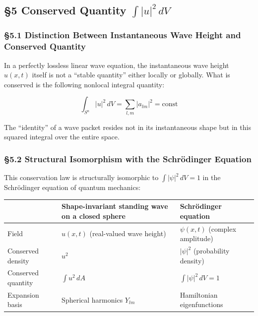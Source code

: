 \documentclass[
  a4paper,11pt]{article}
\newcounter{none}
\theoremstyle{definition}
\theoremstyle{remark}
\begin{document}
\subsection{\texorpdfstring{§5 Conserved Quantity
\(\int |u|^2 \, dV\)}{§5 Conserved Quantity \textbackslash int \textbar u\textbar\^{}2 \textbackslash, dV}}\label{conserved-quantity-int-u2-dv}

\subsubsection{§5.1 Distinction Between Instantaneous Wave Height and
Conserved
Quantity}\label{distinction-between-instantaneous-wave-height-and-conserved-quantity}

In a perfectly lossless linear wave equation, the instantaneous wave
height \(u(x,t)\) itself is not a ``stable quantity'' either locally or
globally. What is conserved is the following nonlocal integral quantity:

\[\int_{S^n} |u|^2 \, dV = \sum_{l,m} |a_{lm}|^2 = \text{const}\]

The ``identity'' of a wave packet resides not in its instantaneous shape
but in this squared integral over the entire space.

\subsubsection{§5.2 Structural Isomorphism with the Schrödinger
Equation}\label{structural-isomorphism-with-the-schruxf6dinger-equation}

This conservation law is structurally isomorphic to
\(\int |\psi|^2 \, dV = 1\) in the Schrödinger equation of quantum
mechanics:

{\def\LTcaptype{none} %
\begin{longtable}[]{@{}
  >{\raggedright\arraybackslash}p{}
  >{\raggedright\arraybackslash}p{}
  >{\raggedright\arraybackslash}p{}@{}}
\toprule\noalign{}
\begin{minipage}[b]{\linewidth}\raggedright
\end{minipage} & \begin{minipage}[b]{\linewidth}\raggedright
Shape-invariant standing wave on a closed sphere
\end{minipage} & \begin{minipage}[b]{\linewidth}\raggedright
Schrödinger equation
\end{minipage} \\
\midrule\noalign{}
\endhead
\bottomrule\noalign{}
\endlastfoot
Field & \(u(x,t)\) (real-valued wave height) & \(\psi(x,t)\) (complex
amplitude) \\
Conserved density & \(u^2\) & \(|\psi|^2\) (probability density) \\
Conserved quantity & \(\int u^2 \, dA\) & \(\int |\psi|^2 \, dV = 1\) \\
Expansion basis & Spherical harmonics \(Y_{lm}\) & Hamiltonian
eigenfunctions \\
\end{longtable}
}
\end{document}
